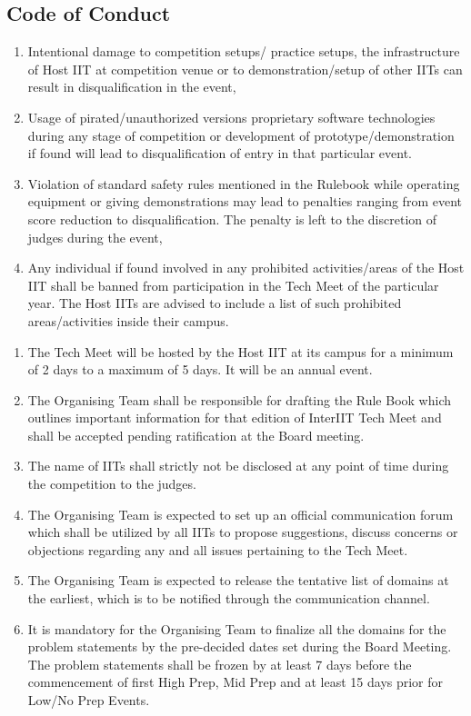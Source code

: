 \subsection{Code of Conduct}
\begin{enumerate}
    \item Intentional damage to competition setups/ practice setups, the infrastructure of Host IIT at competition venue or to demonstration/setup of other IITs can result in disqualification in the event,
    \item Usage of pirated/unauthorized versions proprietary software technologies during any stage of competition or development of prototype/demonstration if found will lead to disqualification of entry in that particular event.
    \item Violation of standard safety rules mentioned in the Rulebook while operating equipment or giving demonstrations may lead to penalties ranging from event score reduction to disqualification. The penalty is left to the discretion of judges during the event,
    \item Any individual if found involved in any prohibited activities/areas of the Host IIT shall be banned from participation in the Tech Meet of the particular year. The Host IITs are advised to include a list of such prohibited areas/activities inside their campus.
\end{enumerate}

\begin{enumerate}
    \item The Tech Meet will be hosted by the Host IIT at its campus for a minimum of 2 days to a maximum of 5 days. It will be an annual event.
    \item The Organising Team shall be responsible for drafting the Rule Book which outlines important information for that edition of InterIIT Tech Meet and shall be accepted pending ratification at the Board meeting.
    \item The name of IITs shall strictly not be disclosed at any point of time during the competition to the judges. 
    \item The Organising Team is expected to set up an official communication forum which shall be utilized by all IITs to propose suggestions, discuss concerns or objections regarding any and all issues pertaining to the Tech Meet.
    \item The Organising Team is expected to release the tentative list of domains at the earliest, which is to be notified through the communication channel.
    \item It is mandatory for the Organising Team to finalize all the domains for the problem statements by the pre-decided dates set during the Board Meeting. The problem statements shall be frozen by at least 7 days before the commencement of first High Prep, Mid Prep and at least 15 days prior for Low/No Prep Events.
\end{enumerate}


